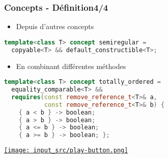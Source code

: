 \documentclass[C++.tex]{subfiles}
\begin{document}
\begin{frame}[fragile]
	\frametitle{Concepts - Définition\titlehfill{}4/4}
	\begin{itemize}
		\item Depuis d'autres concepts
	\end{itemize}

	\begin{lstlisting}[language=C++]
template<class T> concept semiregular = 
  copyable<T> && default_constructible<T>;\end{lstlisting}

	\begin{itemize}
		\item En combinant différentes méthodes
	\end{itemize}

	\begin{lstlisting}[language=C++]
template<class T> concept totally_ordered =
  equality_comparable<T> &&
  requires(const remove_reference_t<T>& a,
           const remove_reference_t<T>& b) {
    { a < b } -> boolean;
    { a > b } -> boolean;
    { a <= b } -> boolean;
    { a >= b } -> boolean; };\end{lstlisting}

	\hfill
	\href{https://godbolt.org/#g:!((g:!((g:!((h:codeEditor,i:(filename:'1',fontScale:14,fontUsePx:'0',j:1,lang:c%2B%2B,selection:(endColumn:6,endLineNumber:16,positionColumn:6,positionLineNumber:16,selectionStartColumn:6,selectionStartLineNumber:16,startColumn:6,startLineNumber:16),source:'%23include+%3Ciostream%3E%0A%0Atemplate%3Ctypename+T%3E%0Aconcept+Foo+%3D+requires+(T+x)+%7B+x+%2B+x%3B+%7D%3B%0A%0Atemplate%3CFoo+T%3E%0AT+foo(T+a,+T+b)%0A%7B%0A++return+a+%2B+b%3B%0A%7D%0A%0Aint+main()%0A%7B%0A++std::cout+%3C%3C+foo(5,+2)+%3C%3C+%22%5Cn%22%3B%0A%0A%23if+1%0A++int+*bar,+*baz%3B%0A++std::cout+%3C%3C+foo(bar,+baz)+%3C%3C+%22%5Cn%22%3B%0A%23endif%0A%7D%0A'),l:'5',n:'0',o:'C%2B%2B+source+%231',t:'0')),k:50,l:'4',n:'0',o:'',s:0,t:'0'),(g:!((h:executor,i:(argsPanelShown:'1',compilationPanelShown:'0',compiler:g112,compilerOutShown:'0',execArgs:'',execStdin:'',fontScale:14,fontUsePx:'0',j:1,lang:c%2B%2B,libs:!((name:boost,ver:'175')),options:'-std%3Dc%2B%2B20',source:1,stdinPanelShown:'1',tree:'1',wrap:'0'),l:'5',n:'0',o:'Executor+x86-64+gcc+11.2+(C%2B%2B,+Editor+%231)',t:'0')),header:(),k:50,l:'4',n:'0',o:'',s:0,t:'0')),l:'2',n:'0',o:'',t:'0')),version:4}{\texttt{[image: input\_src/play-button.png]}}
\end{frame}
\end{document}

